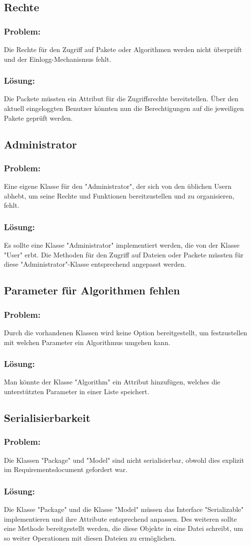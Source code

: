 \documentclass{article}
\newcommand{\RPS}[3]{\subsection{#1} \subsubsection*{Problem:} #2 \subsubsection*{Lösung:} #3}
\begin{document}
\RPS{Rechte}{%
	Die Rechte für den Zugriff auf Pakete oder Algorithmen werden nicht überprüft und der Einlogg-Mechanismus fehlt.%
}{%
Die Packete müssten ein Attribut für die Zugriffsrechte bereitstellen. Über den aktuell eingeloggten Benutzer könnten nun die Berechtigungen auf die jeweiligen Pakete geprüft werden.%
}

\RPS{Administrator}{%
	Eine eigene Klasse für den "Administrator", der sich von den üblichen Usern abhebt, um seine Rechte und Funktionen bereitzustellen und zu organisieren, fehlt.%
}{%
Es sollte eine Klasse "Administrator" implementiert werden, die von der Klasse "User" erbt. Die Methoden für den Zugriff auf Dateien oder Packete müssten für diese "Administrator"-Klasse entsprechend angepasst werden.%
}

\RPS{Parameter für Algorithmen fehlen}{%
Durch die vorhandenen Klassen wird keine Option bereitgestellt, um festzustellen mit welchen Parameter ein Algorithmus umgehen kann.%
}{%
Man könnte der Klasse "Algorithm" ein Attribut hinzufügen, welches die unterstützten Parameter in einer Liste speichert.%
}

\RPS{Serialisierbarkeit}{%
Die Klassen "Package" und "Model" sind nicht serialisierbar, obwohl dies explizit im Requirementsdocument gefordert war.
}{%
Die Klasse "Package" und die Klasse "Model" müssen das Interface "Serializable" implementieren und ihre Attribute entsprechend anpassen. Des weiteren sollte eine Methode bereitgestellt werden, die diese Objekte in eine Datei schreibt, um so weiter Operationen mit diesen Dateien zu ermöglichen.
}
\end{document}
